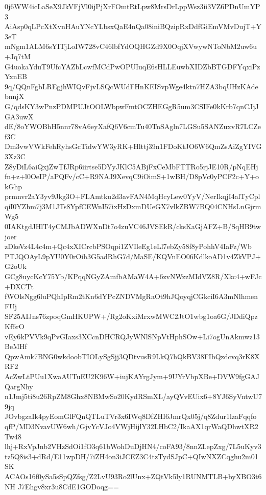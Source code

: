 0j6WW4icLaSeX9JkVFjVl0ijPjXrFOmtRtLpw8MrsDrLppWsz3ii3VZ6PDnUmYP3
AiAsp0qLPcXtXvnHAuYNcYLbsxQaE4nQa08iniBQzipRxDdfGiEmVMvDujT+Y3eT
mNgm1ALM6sYITjLoIW728vC46lbfYdOQHGZd9X0OqjXVwywNToNbM2uw6u+Jq7tM
G4uokaYduT9UfcYAZbLcwfMCdPwOPUIuqE6sHLLEuwbXIDZbBTGDFYqxiPzYxnEB
9q/QQnFgbLREgjhWIQvFjvLSQcWUdFHnKEISvpWge4ktn7HZA3bqUHzKAdebnnjX
G/qdsKY3wPnzPDMPUJtOOLWbpwFmtOCZHEGgR5um3CSIFe0kKrb7qnCJjJGA3uwX
dE/8oYWOBhH5nnr78vA6eyXafQ6V6cmTu40TnSAgln7LGSu5SANZuxvR7LCZef3C
Dm3vwVWkFehRyhsGcTidwYW3yRK+Hlttj39n1FDoKtJO6W6QmZsAiZgYIVG3Xz3C
Z8yDiL6aiQxjZwTfJRp6iirtse5DYyJKlC5ABjFxCeMbFTTRo5rjJE10R/pNqEHj
fn+z+l0OeIP/aPQFv/cC+R9NAJ9XevqC9iOimS+1wBH/D8pVc0yPCF2c+Y+okGhp
prmnvr2aY3yv9Jkg3O+FLAmtku2d3avFAN4MqHcyLew0YyV/NerIkqjI4alTyCpl
qiI0YZhm7j3M1JTs8YpfCEWnI57ixHzDxmDUeGX7vlkZBW7BQ04CNHsLnGjrmWg5
0IAKtgdJHlT4yCMJbADWXnDt7o4zuVC46JVSEkR/cksKaGjAFZ+B/SqHB9twjoer
zDkeVz4L4c4m+Qc4xXICrcbPSOqpi1ZVIleEg1eLl7ebZy58f8yPohhV4IaFz/Wb
PTJQOAyL9pYU0Y0rOih3G5adRhG7d/MaSE/KQVnEO06KdlkoAD1v4ZkVPJ+G2oUk
GCg8uycKcY75Yb/KPqqNGyZAmfbAMaW4A+6zvNWzzMIdVZ8R/Xkc4+wFJc+DXCTt
fWOlsNgg6luPQhIpRm2tKn6dYPcZNDVMgRaOt9hJQoyqjCGkciI6A3mNlhmenFUj
SF25AIJns76zpoqGmHKUPW+/Rg2oKxiMrxwMWC2JtO1wbg1oa6G/JDdiQpzKf6rO
vEy6kPVVk9qPvGIaxs3XCcnDHCRQJyWNlSNpVtHphSOw+Li7ogUnAkmwz13BeMHf
QpwAmk7BNG0wkdoobTIOLySgSjj3QDtvusR9LkQ7hQkBV38FIbQzdcvq3rK8XRF2
AcZwLtPUu1XwaAUTuEU2K96W+iujKAYrgJym+9UYrVbpXBe+DVW9fgGAJQargNhy
n1Jmj5ti8u26RpZM8Ghx8NBMwSo20KydRSmXL/ayQVvEUix6+8YJ6SyVntwU79jq
JOvbgzaIk4pyEomGlFQnQTLuTVr3x6IWq8DfZHI6JmrQx05j/q8Zdur1lzaFqqfo
qfP/MD3NvavUW6wh/GjvYcVJo4VWjHijlY32LHbC2/IkaAX1qrWaQDhwtXR2Tw48
lhj+RxVpJnb2VHzSdOi1fO3q61bWohDuDjHN4/coFA93/8nnZLepZxg/7L5uKyv3
tz5Q8is3+dRd/E11wpDH/7iZH4on3iJCEZ3C4tzTydSJpC+QIwNXZCqghu2m01SK
ACAOs16f0ySa5sSpQZfsg/Z2LvU93Ro2lUnx+ZQtVk5ly1RUNMTLB+byXBO3t6NH
J7Ehgv8xr3u8CdE1GODoqg==
